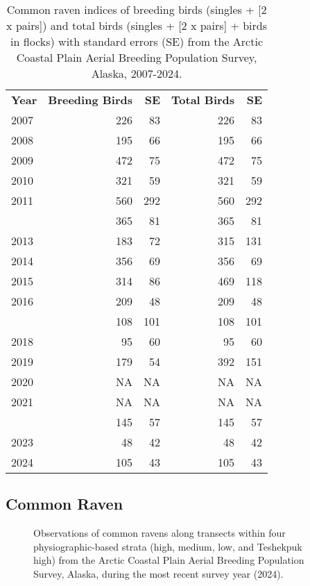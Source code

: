 \documentclass[
]{article}
\begin{document}
\begin{longtable}[t]{lrrrr}

\caption{\label{tbl-CORA}Common raven indices of breeding birds (singles
+ {[}2 x pairs{]}) and total birds (singles + {[}2 x pairs{]} + birds in
flocks) with standard errors (SE) from the Arctic Coastal Plain Aerial
Breeding Population Survey, Alaska, 2007-2024.}

\tabularnewline

\\
\toprule
\textbf{Year} & \textbf{Breeding Birds} & \textbf{SE} & \textbf{Total Birds} & \textbf{SE}\\
\midrule
2007 & 226 & 83 & 226 & 83\\
2008 & 195 & 66 & 195 & 66\\
2009 & 472 & 75 & 472 & 75\\
2010 & 321 & 59 & 321 & 59\\
2011 & 560 & 292 & 560 & 292\\
\addlinespace
2012 & 365 & 81 & 365 & 81\\
2013 & 183 & 72 & 315 & 131\\
2014 & 356 & 69 & 356 & 69\\
2015 & 314 & 86 & 469 & 118\\
2016 & 209 & 48 & 209 & 48\\
\addlinespace
2017 & 108 & 101 & 108 & 101\\
2018 & 95 & 60 & 95 & 60\\
2019 & 179 & 54 & 392 & 151\\
2020 & NA & NA & NA & NA\\
2021 & NA & NA & NA & NA\\
\addlinespace
2022 & 145 & 57 & 145 & 57\\
2023 & 48 & 42 & 48 & 42\\
2024 & 105 & 43 & 105 & 43\\
\bottomrule

\end{longtable}

\endgroup{}

\newpage{}

\subsection*{Common Raven}\label{common-raven-2}

\begin{figure}


\caption{\label{fig-CORAmap}Observations of common ravens along
transects within four physiographic-based strata (high, medium, low, and
Teshekpuk high) from the Arctic Coastal Plain Aerial Breeding Population
Survey, Alaska, during the most recent survey year (2024).}

\end{figure}%

\newpage{}
\end{document}
